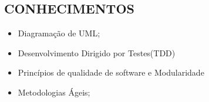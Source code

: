 \begin{framed}
    \section{CONHECIMENTOS}
    \begin{itemize}
      \item Diagramação de UML;
      \item Desenvolvimento Dirigido por Testes(TDD)
      \item Princípios de qualidade de software e Modularidade
      \item Metodologias Ágeis;
    \end{itemize}
  \end{framed}